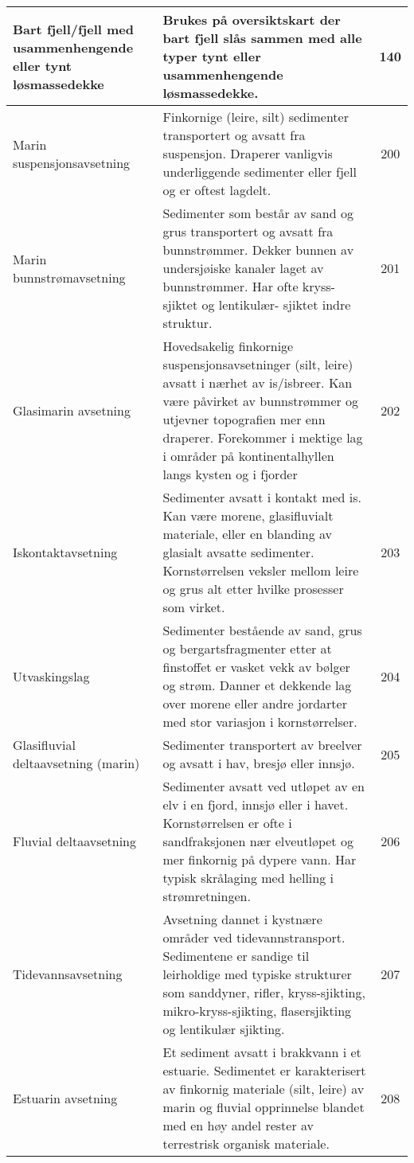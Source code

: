 \begin{longtable}{|p{3.5cm}|p{6.2cm}|c|}
    Bart fjell/fjell med usammenhengende eller  tynt løsmassedekke & Brukes på oversiktskart der bart fjell slås sammen med alle typer tynt eller usammenhengende løsmassedekke. & 140 \\ \hline
    Marin suspensjonsavsetning & Finkornige (leire, silt) sedimenter transportert og avsatt fra suspensjon. Draperer vanligvis underliggende sedimenter eller fjell og er oftest lagdelt. & 200 \\ \hline
    Marin bunnstrømavsetning & Sedimenter som består av sand og grus transportert og avsatt fra bunnstrømmer. Dekker bunnen av undersjøiske kanaler laget av bunnstrømmer. Har ofte kryss-sjiktet og lentikulær- sjiktet indre struktur. & 201 \\ \hline
    Glasimarin avsetning & Hovedsakelig finkornige suspensjonsavsetninger (silt, leire) avsatt i nærhet av is/isbreer. Kan være påvirket av bunnstrømmer og utjevner topografien mer enn draperer. Forekommer i mektige lag i områder på kontinentalhyllen langs kysten og i fjorder & 202 \\ \hline
    Iskontaktavsetning & Sedimenter avsatt i kontakt med is. Kan være morene, glasifluvialt materiale, eller en blanding av glasialt avsatte sedimenter. Kornstørrelsen veksler mellom leire og grus alt etter hvilke prosesser som virket. & 203 \\ \hline
    Utvaskingslag & Sedimenter bestående av sand, grus og bergartsfragmenter etter at finstoffet er vasket vekk av bølger og strøm. Danner et dekkende lag over morene eller andre jordarter med stor variasjon i kornstørrelser. & 204 \\ \hline
    Glasifluvial deltaavsetning (marin) & Sedimenter transportert av breelver og avsatt i hav, bresjø eller innsjø. & 205 \\ \hline
    Fluvial deltaavsetning & Sedimenter avsatt ved utløpet av en elv i en fjord, innsjø eller i havet. Kornstørrelsen er ofte i sandfraksjonen nær elveutløpet og mer finkornig på dypere vann. Har typisk skrålaging med helling i strømretningen. & 206 \\ \hline
    Tidevannsavsetning & Avsetning dannet i kystnære områder ved tidevannstransport. Sedimentene er sandige til leirholdige med typiske strukturer som sanddyner, rifler, kryss-sjikting, mikro-kryss-sjikting, flasersjikting og lentikulær sjikting. & 207 \\ \hline
    Estuarin avsetning & Et sediment avsatt i brakkvann i et estuarie. Sedimentet er karakterisert av finkornig materiale (silt, leire) av marin og fluvial opprinnelse blandet med en høy andel rester av terrestrisk organisk materiale. & 208 \\ \hline

\end{longtable}
